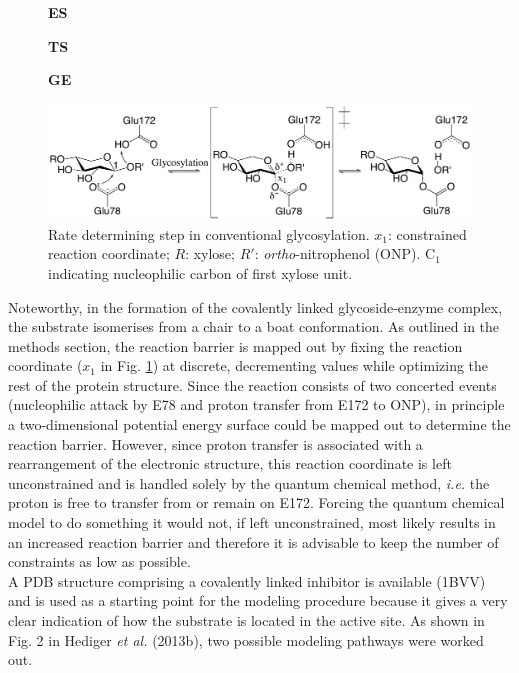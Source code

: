 \begin{figure}[htbp] 
\centering
\begin{minipage}{0.38\linewidth}
\textbf{ES}
\end{minipage}
\textbf{TS}\hfill
\begin{minipage}{0.25\linewidth}
\textbf{GE}
\end{minipage}
\includegraphics[width=1.0\linewidth]{mechanism.pdf}
\caption{
Rate determining step in conventional glycosylation. $x_1$: constrained reaction coordinate; $R$: xylose; 
$R'$: \textit{ortho}-nitrophenol (ONP).
C$_1$ indicating nucleophilic carbon of first xylose unit\cite{hediger2013computational}.
}
\label{fig:bcx_mechanism}
\end{figure}
Noteworthy, in the formation of the covalently linked glycoside-enzyme complex, the substrate isomerises from a chair to a boat conformation.
As outlined in the methods section, the reaction barrier is mapped out by fixing the reaction coordinate ($x_1$ in Fig. \ref{fig:bcx_mechanism}) at discrete, decrementing values while optimizing the rest of the protein structure.
Since the reaction consists of two concerted events (nucleophilic attack by E78 and proton transfer from E172 to ONP), in principle a two-dimensional potential energy surface could be mapped out to determine the reaction barrier.
However, since proton transfer is associated with a rearrangement of the electronic structure, this reaction coordinate is left unconstrained and is handled solely by the quantum chemical method, \textit{i.e.} the proton is free to transfer from or remain on E172.
Forcing the quantum chemical model to do something it would not, if left unconstrained, most likely results in an increased reaction barrier and therefore it is advisable to keep the number of constraints as low as possible.\\
A PDB structure comprising a covalently linked inhibitor is available (1BVV) and is used as a starting point for the modeling procedure because it gives a very clear indication of how the substrate is located in the active site.
As shown in Fig. 2 in Hediger \textit{et al.} (2013b), two possible modeling pathways were worked out.

